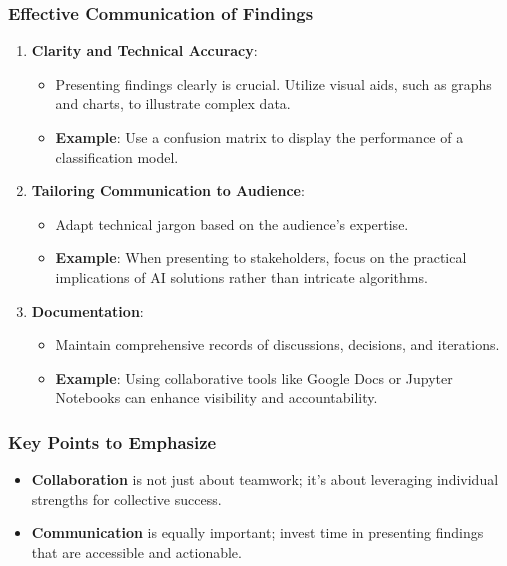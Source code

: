 \documentclass{beamer}
\begin{document}
\begin{frame}[fragile]
    \frametitle{Effective Communication of Findings}
    \begin{enumerate}
        \item \textbf{Clarity and Technical Accuracy}:
        \begin{itemize}
            \item Presenting findings clearly is crucial. Utilize visual aids, such as graphs and charts, to illustrate complex data.
            \item \textbf{Example}: Use a confusion matrix to display the performance of a classification model.
        \end{itemize}
        
        \item \textbf{Tailoring Communication to Audience}:
        \begin{itemize}
            \item Adapt technical jargon based on the audience's expertise.
            \item \textbf{Example}: When presenting to stakeholders, focus on the practical implications of AI solutions rather than intricate algorithms.
        \end{itemize}
        
        \item \textbf{Documentation}:
        \begin{itemize}
            \item Maintain comprehensive records of discussions, decisions, and iterations.
            \item \textbf{Example}: Using collaborative tools like Google Docs or Jupyter Notebooks can enhance visibility and accountability.
        \end{itemize}
    \end{enumerate}
\end{frame}

\begin{frame}[fragile]
    \frametitle{Key Points to Emphasize}
    \begin{itemize}
        \item \textbf{Collaboration} is not just about teamwork; it's about leveraging individual strengths for collective success.
        \item \textbf{Communication} is equally important; invest time in presenting findings that are accessible and actionable.
    \end{itemize}
\end{frame}
\end{document}
